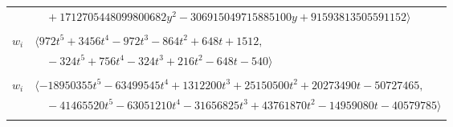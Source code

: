 \documentclass[11pt]{article}
\begin{document}
\begin{longtable}{@{}ll@{}}
 & $\quad +1712705448099800682y^{2}-306915049715885100y+91593813505591152\rangle$\\
\addlinespace[2pt]
\multicolumn{2}{@{}p{0.97\textwidth}@{}}{$i=57$, $D_i=12$, $e_i=0$, $\rho_{ij}$: $0{:}2, \allowbreak 7{:}2, \allowbreak 20{:}2, \allowbreak 25{:}1, \allowbreak 43{:}1, \allowbreak 44{:}2, \allowbreak 48{:}1$}\\
$w_i$ & $\langle 972t^{5}+3456t^{4}-972t^{3}-864t^{2}+648t+1512,$\\
 & $\quad -324t^{5}+756t^{4}-324t^{3}+216t^{2}-648t-540\rangle$\\
\addlinespace[2pt]
\multicolumn{2}{@{}p{0.97\textwidth}@{}}{$i=58$, $D_i=9$, $e_i=1$, $\rho_{ij}$: $3{:}2, \allowbreak 6{:}1, \allowbreak 15{:}2, \allowbreak 20{:}1, \allowbreak 21{:}2, \allowbreak 28{:}1, \allowbreak 31{:}2, \allowbreak 37{:}1, \allowbreak 38{:}1, \allowbreak 41{:}2, \allowbreak 50{:}2, \allowbreak 54{:}1$}\\
$w_i$ & $\langle -18950355t^{5}-63499545t^{4}+1312200t^{3}+25150500t^{2}+20273490t-50727465,$\\
 & $\quad -41465520t^{5}-63051210t^{4}-31656825t^{3}+43761870t^{2}-14959080t-40579785\rangle$\\
\addlinespace[2pt]
\end{longtable}
\endgroup
\end{document}
